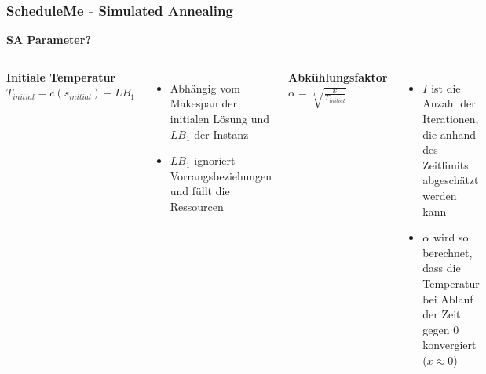 \documentclass[aspectratio=169]{beamer}
\begin{document}

\begin{frame}[c]
\frametitle{ScheduleMe - Simulated Annealing}
	\centering

	\Large
	\vspace{-16pt}
	\textbf{SA Parameter?}
	\vspace{10pt}

	\begin{columns}[t]
		
			\centering
			\large
			\textbf{Initiale Temperatur}\\
			\vspace{20pt}
			$T_{initial} = c(s_{initial}) - LB_1$
			\vspace{12pt}
			\small
			\begin{itemize}
				\item Abhängig vom Makespan der initialen Lösung und $LB_1$ der Instanz
				\item $LB_1$ ignoriert Vorrangsbeziehungen und füllt die Ressourcen
			\end{itemize}

		
			\centering
			\large
			\textbf{Abkühlungsfaktor}\\
			\vspace{10pt}
			$\alpha = \sqrt[I]{\frac{x}{T_{initial}}}$
			\vspace{12pt}
			\small
			\begin{itemize}
				\item $I$ ist die Anzahl der Iterationen, die anhand des Zeitlimits abgeschätzt werden kann
				\item $\alpha$ wird so berechnet, dass die Temperatur bei Ablauf der Zeit gegen 0 konvergiert ($x \approx 0$)
			\end{itemize}
			
	\end{columns}
\end{frame}

\end{document}
